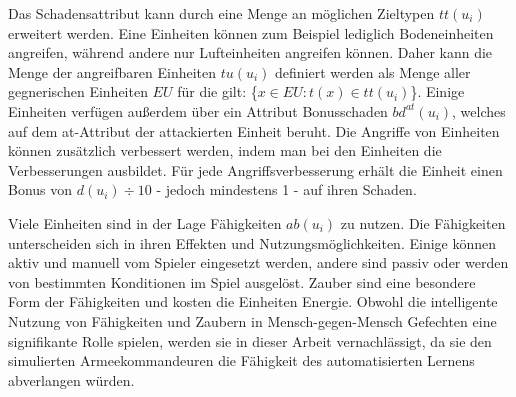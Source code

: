 Das Schadensattribut kann durch eine Menge an möglichen Zieltypen $tt(u_i)$ erweitert werden. Eine Einheiten können zum Beispiel lediglich Bodeneinheiten angreifen, während andere nur Lufteinheiten angreifen können. Daher kann die Menge der angreifbaren Einheiten $tu(u_i)$ definiert werden als Menge aller gegnerischen Einheiten $EU$ für die gilt: \{$x \in EU : t(x) \in tt(u_i)$\}. Einige Einheiten verfügen außerdem über ein Attribut Bonusschaden $bd^{at}(u_i)$, welches auf dem at-Attribut der attackierten Einheit beruht. Die Angriffe von Einheiten können zusätzlich verbessert werden, indem man bei den Einheiten die Verbesserungen ausbildet. Für jede Angriffsverbesserung erhält die Einheit einen Bonus von $d(u_i) \div 10$ - jedoch mindestens 1 - auf ihren Schaden. 

Viele Einheiten sind in der Lage Fähigkeiten $ab(u_i)$ zu nutzen. Die Fähigkeiten unterscheiden sich in ihren Effekten und Nutzungsmöglichkeiten. Einige können aktiv und manuell vom Spieler eingesetzt werden, andere sind passiv oder werden von bestimmten Konditionen im Spiel ausgelöst. Zauber sind eine besondere Form der Fähigkeiten und kosten die Einheiten Energie. Obwohl die intelligente Nutzung von Fähigkeiten und Zaubern in Mensch-gegen-Mensch Gefechten eine signifikante Rolle spielen, werden sie in dieser Arbeit vernachlässigt, da sie den simulierten Armeekommandeuren die Fähigkeit des automatisierten Lernens abverlangen würden. 